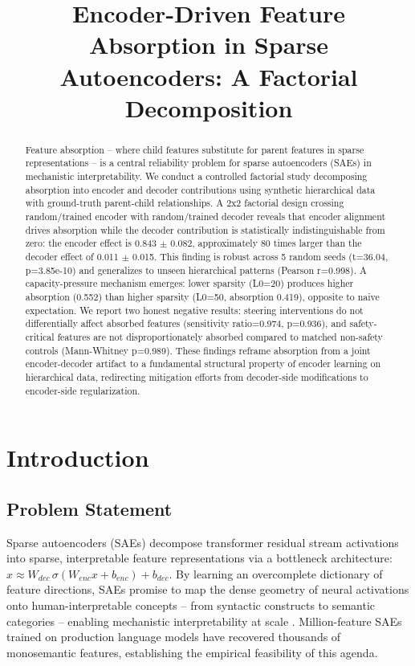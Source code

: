 \documentclass{article}
\title{Encoder-Driven Feature Absorption in Sparse Autoencoders: A Factorial Decomposition}
\begin{document}
\maketitle

\begin{abstract}
Feature absorption -- where child features substitute for parent features in sparse representations -- is a central reliability problem for sparse autoencoders (SAEs) in mechanistic interpretability. We conduct a controlled factorial study decomposing absorption into encoder and decoder contributions using synthetic hierarchical data with ground-truth parent-child relationships. A 2x2 factorial design crossing random/trained encoder with random/trained decoder reveals that encoder alignment drives absorption while the decoder contribution is statistically indistinguishable from zero: the encoder effect is 0.843 $\pm$ 0.082, approximately 80 times larger than the decoder effect of 0.011 $\pm$ 0.015. This finding is robust across 5 random seeds (t=36.04, p=3.85e-10) and generalizes to unseen hierarchical patterns (Pearson r=0.998). A capacity-pressure mechanism emerges: lower sparsity (L0=20) produces higher absorption (0.552) than higher sparsity (L0=50, absorption 0.419), opposite to naive expectation. We report two honest negative results: steering interventions do not differentially affect absorbed features (sensitivity ratio=0.974, p=0.936), and safety-critical features are not disproportionately absorbed compared to matched non-safety controls (Mann-Whitney p=0.989). These findings reframe absorption from a joint encoder-decoder artifact to a fundamental structural property of encoder learning on hierarchical data, redirecting mitigation efforts from decoder-side modifications to encoder-side regularization.
\end{abstract}

\section{Introduction}

\subsection{Problem Statement}

Sparse autoencoders (SAEs) decompose transformer residual stream activations into sparse, interpretable feature representations via a bottleneck architecture: $x \approx W_{dec} \, \sigma(W_{enc} x + b_{enc}) + b_{dec}$. By learning an overcomplete dictionary of feature directions, SAEs promise to map the dense geometry of neural activations onto human-interpretable concepts -- from syntactic constructs to semantic categories -- enabling mechanistic interpretability at scale \citep{bricken2023, templeton2024}. Million-feature SAEs trained on production language models have recovered thousands of monosemantic features, establishing the empirical feasibility of this agenda.
\end{document}
